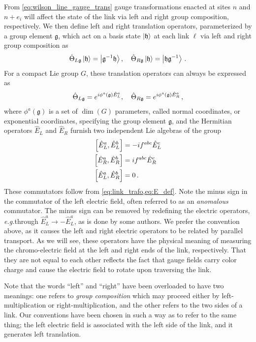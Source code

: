 \documentclass[reprint,superscriptaddress,pra,nofootinbib,preprintnumbers,floatfix]{revtex4-1}
\providecommand{\eg}{\emph{e.g.}}
\providecommand{\g}{{\mathfrak{g}}}
\providecommand{\h}{{\mathfrak{h}}}
\begin{document}
From \cref{eq:wilson_line_gauge_trans} gauge transformations enacted at sites $n$ and $n+e_i$ will affect the state of the link via left and right group composition, respectively. 
%
We then define left and right translation operators, parameterized by a group element $\g$, which act on a basis state $\ket{\h}$ at each link $\ell$ via left and right group composition as
%
\begin{equation}
\label{eq:link_trafo}
\hat{\Theta}_{L\g} \ket{\h} = \ket{\g^{-1}\h} \qc\hat{\Theta}_{R\g} \ket{\h} = \ket{\h\g^{-1}} \,.
\end{equation}
%
For a compact Lie group $G$, these translation operators can always be expressed as
%
\begin{equation}\label{eq:E_def}
\hat{\Theta}_{L\g} = e^{i \phi^a(\g) \hat E_L^a} \qc\hat{\Theta}_{R\g} = e^{i \phi^a(\g) \hat E_R^a} \,,
\end{equation}
%
where $\phi^a(\g)$ is a set of $\dim(G)$ parameters, called normal coordinates, or exponential coordinates, specifying the group element $\g$, and the Hermitian operators $\hat E_L$ and $\hat E_R$ furnish two independent Lie algebras of the group
%
\begin{equation}
\label{eq:EEcommutators}
\begin{split}
\comm{\hat{E}_L^a}{\hat{E}_L^b} &= -i f^{abc} \hat{E}_L^c \\
\comm{\hat{E}_R^a}{\hat{E}_R^b} &= i f^{abc} \hat{E}_R^c \\
\comm{\hat{E}_L^a}{\hat{E}_R^b} &= 0 \,.
\end{split}
\end{equation}
%
These commutators follow from \cref{eq:link_trafo,eq:E_def}. 
%
Note the minus sign in the commutator of the left electric field, often referred to as an \emph{anomalous} commutator. 
%
The minus sign can be removed by redefining the electric operators, \eg through $\hat{E}_L^a \to -\hat{E}_L^a$, as is done by some authors. 
%
We prefer the convention above, as it causes the left and right electric operators to be related by parallel transport. 
%
As we will see, these operators have the physical meaning of measuring the chromo-electric field at the left and right ends of the link, respectively. 
%
That they are not equal to each other reflects the fact that gauge fields carry color charge and cause the electric field to rotate upon traversing the link. 



Note that the words ``left'' and ``right'' have been overloaded to have two meanings: one refers to \emph{group composition} which may proceed either by left-multiplication or right-multiplication, and the other refers to the two sides of a link. 
%
Our conventions have been chosen in such a way as to refer to the same thing; the left electric field is associated with the left side of the link, and it generates left translation. 
\end{document}
